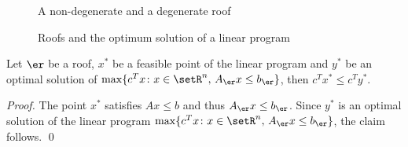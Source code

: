 \begin{figure}[htbp]
  \centering
  \caption{A non-degenerate and a degenerate roof}
  \label{fig:non-deg-deg}
\end{figure}





\begin{figure}[htbp]
  \centering
  {
}
  \caption{Roofs and the optimum solution of a linear program}
  \label{fig:highest_point}
\end{figure}




\begin{theorem}
  \label{thr:1}
  Let  $\er$ be a roof,  $x^*$ be a feasible point of the linear
  program and $y^*$ be an optimal solution of $\max\{c^Tx \colon x \in
  \setR^n, \, A_\er x \leq b_\er\}$, then $c^Tx^* \leq c^Ty^*$. 
\end{theorem}


\begin{proof}
  The point $x^*$ satisfies $Ax\leq b$ and thus $A_\er x\leq b_\er$. Since
  $y^*$ is an optimal solution of the linear program $\max\{c^Tx \colon x
  \in \setR^n, \, A_\er x \leq b_\er \}$,   the claim follows. 
\qed
\end{proof}









